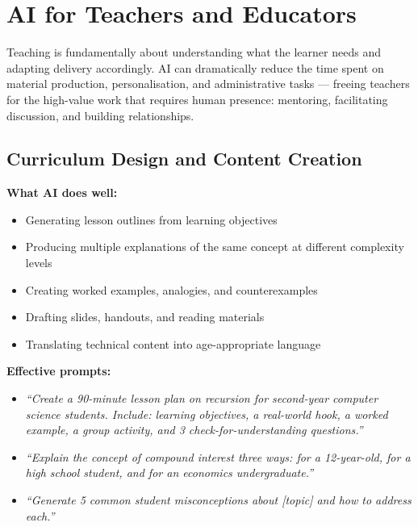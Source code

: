 \chapter{AI for Teachers and Educators}
\label{ch:teachers}

Teaching is fundamentally about understanding what the learner needs and adapting
delivery accordingly.
AI can dramatically reduce the time spent on material production, personalisation, and
administrative tasks --- freeing teachers for the high-value work that requires human
presence: mentoring, facilitating discussion, and building relationships.

\section{Curriculum Design and Content Creation}
\label{sec:curriculum}

\textbf{What AI does well:}
\begin{itemize}
  \item Generating lesson outlines from learning objectives
  \item Producing multiple explanations of the same concept at different complexity levels
  \item Creating worked examples, analogies, and counterexamples
  \item Drafting slides, handouts, and reading materials
  \item Translating technical content into age-appropriate language
\end{itemize}

\textbf{Effective prompts:}
\begin{itemize}
  \item \textit{``Create a 90-minute lesson plan on recursion for second-year computer science students. Include: learning objectives, a real-world hook, a worked example, a group activity, and 3 check-for-understanding questions.''}
  \item \textit{``Explain the concept of compound interest three ways: for a 12-year-old, for a high school student, and for an economics undergraduate.''}
  \item \textit{``Generate 5 common student misconceptions about [topic] and how to address each.''}
\end{itemize}

